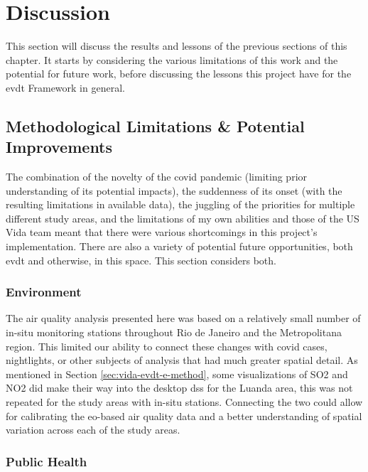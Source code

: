 \section{Discussion} \label{sec:vida-discuss}

This section will discuss the results and lessons of the previous sections of this chapter. It starts by considering the various limitations of this work and the potential for future work, before discussing the lessons this project have for the \ac{evdt} Framework in general.

\subsection{Methodological Limitations \& Potential Improvements}

The combination of the novelty of the \ac{covid} pandemic (limiting prior understanding of its potential impacts), the suddenness of its onset (with the resulting limitations in available data), the juggling of the priorities for multiple different study areas, and the limitations of my own abilities and those of the US Vida team meant that there were various shortcomings in this project's implementation. There are also a variety of potential future opportunities, both \ac{evdt} and otherwise, in this space. This section considers both.

\subsubsection{Environment}

The air quality analysis presented here was based on a relatively small number of in-situ monitoring stations throughout Rio de Janeiro and the Metropolitana region. This limited our ability to connect these changes with \ac{covid} cases, nightlights, or other subjects of analysis that had much greater spatial detail. As mentioned in Section \ref{sec:vida-evdt-e-method}, some visualizations of SO2 and NO2 did make their way into the desktop \ac{dss} for the Luanda area, this was not repeated for the study areas with in-situ stations. Connecting the two could allow for calibrating the \ac{eo}-based air quality data and a better understanding of spatial variation across each of the study areas.

\subsubsection{Public Health}

